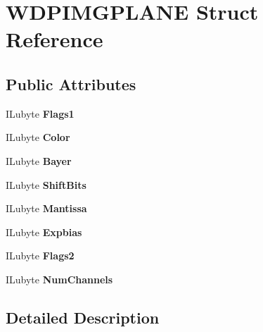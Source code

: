 \hypertarget{structWDPIMGPLANE}{}\section{W\+D\+P\+I\+M\+G\+P\+L\+A\+NE Struct Reference}
\label{structWDPIMGPLANE}
\subsection*{Public Attributes}
\begin{DoxyCompactItemize}
\item 
\mbox{\label{structWDPIMGPLANE_ab2f88045ce92e746db6878e7b841830e}} 
I\+Lubyte {\bfseries Flags1}
\item 
\mbox{\label{structWDPIMGPLANE_a4f0eed93939122bceea8b28e50fa0fa4}} 
I\+Lubyte {\bfseries Color}
\item 
\mbox{\label{structWDPIMGPLANE_af7bff88d0972677b2824f04ace38696f}} 
I\+Lubyte {\bfseries Bayer}
\item 
\mbox{\label{structWDPIMGPLANE_a020ac80d9a05895decf9cee0c991edce}} 
I\+Lubyte {\bfseries Shift\+Bits}
\item 
\mbox{\label{structWDPIMGPLANE_a37ec1fe89b06b805fa203cd5b74fe1bd}} 
I\+Lubyte {\bfseries Mantissa}
\item 
\mbox{\label{structWDPIMGPLANE_aa0eec0aba4650e354c06b2eb4cb99e72}} 
I\+Lubyte {\bfseries Expbias}
\item 
\mbox{\label{structWDPIMGPLANE_a8619be2347018aba6772b5d80a67ffc4}} 
I\+Lubyte {\bfseries Flags2}
\item 
\mbox{\label{structWDPIMGPLANE_a9a0b3e11e6d54876a4c73edd332f7074}} 
I\+Lubyte {\bfseries Num\+Channels}
\end{DoxyCompactItemize}


\subsection{Detailed Description}


